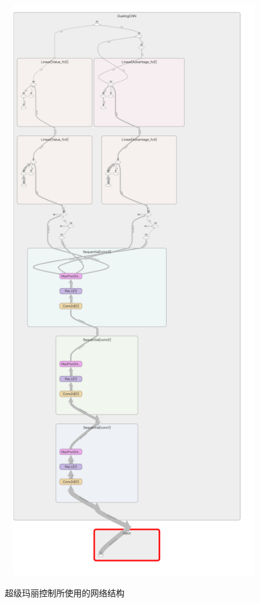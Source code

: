 \begin{figure}
  \centering
  \caption{超级玛丽控制所使用的网络结构}
  \includegraphics[width=500pt,height=700pt]{static/dueling_net.png}
  \label{fig:net}
\end{figure}
\cleardoublepage
